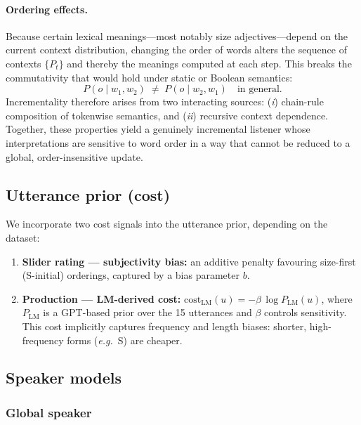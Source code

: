\documentclass[11pt, a4paper]{article}
\newcommand{\eg}{\textit{e.g.}}
\newcommand{\utter}[1]{\textsf{#1}} %
\begin{document}
\paragraph{Ordering effects.}
Because certain lexical meanings---most notably size adjectives---depend on the current context distribution, changing the order of words alters the sequence of contexts $\{P_t\}$ and thereby the meanings computed at each step.
This breaks the commutativity that would hold under static or Boolean semantics:
\begin{equation}
  P(o \mid w_1,w_2) \;\neq\; P(o \mid w_2,w_1) \quad\text{in general.}
  \label{eq:noncommutativity}
\end{equation}
Incrementality therefore arises from two interacting sources: (\emph{i}) chain-rule composition of tokenwise semantics, and (\emph{ii}) recursive context dependence.
Together, these properties yield a genuinely incremental listener whose interpretations are sensitive to word order in a way that cannot be reduced to a global, order-insensitive update.

\subsection{Utterance prior (cost)}
\label{sec:model:cost}

We incorporate two cost signals into the utterance prior, depending on the dataset:
\begin{enumerate}[label=(\roman*)]
  \item \textbf{Slider rating --- subjectivity bias:} an additive penalty favouring size-first (S-initial) orderings, captured by a bias parameter $b$.
  \item \textbf{Production --- LM-derived cost:} $\text{cost}_\text{LM}(u) = -\beta\,\log P_\text{LM}(u)$,
    where $P_\text{LM}$ is a GPT-based prior over the 15 utterances and
    $\beta$ controls sensitivity.  This cost implicitly captures frequency and length biases: shorter, high-frequency forms (\eg\ \utter{S}) are cheaper.
\end{enumerate}

\subsection{Speaker models}
\label{sec:model:speakers}

\subsubsection{Global speaker}
\label{sec:model:speakers:global}
\end{document}
